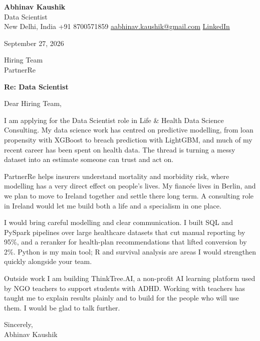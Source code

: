 \documentclass[11pt,a4paper]{article}
\begin{document}
{\Large\bfseries Abhinav Kaushik}\\
Data Scientist\\
New Delhi, India \textbar{} +91 8700571859 \textbar{} \href{mailto:aabhinav.kaushik@gmail.com}{aabhinav.kaushik@gmail.com} \textbar{} \href{https://www.linkedin.com/in/abhinav-kaushik10/}{LinkedIn}  

September 27, 2026

Hiring Team\\
PartnerRe

\textbf{Re: Data Scientist}

Dear Hiring Team,

I am applying for the Data Scientist role in Life \& Health Data Science Consulting. My data science work has centred on predictive modelling, from loan propensity with XGBoost to breach prediction with LightGBM, and much of my recent career has been spent on health data. The thread is turning a messy dataset into an estimate someone can trust and act on.

PartnerRe helps insurers understand mortality and morbidity risk, where modelling has a very direct effect on people's lives. My fiancée lives in Berlin, and we plan to move to Ireland together and settle there long term. A consulting role in Ireland would let me build both a life and a specialism in one place.

I would bring careful modelling and clear communication. I built SQL and PySpark pipelines over large healthcare datasets that cut manual reporting by 95\%, and a reranker for health-plan recommendations that lifted conversion by 2\%. Python is my main tool; R and survival analysis are areas I would strengthen quickly alongside your team.

Outside work I am building ThinkTree.AI, a non-profit AI learning platform used by NGO teachers to support students with ADHD. Working with teachers has taught me to explain results plainly and to build for the people who will use them. I would be glad to talk further.

Sincerely,\\[4pt]
Abhinav Kaushik
\end{document}
